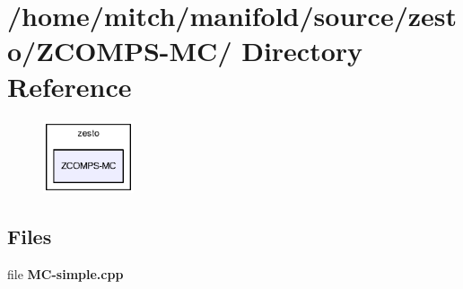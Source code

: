 \section{/home/mitch/manifold/source/zesto/ZCOMPS-MC/ Directory Reference}
\label{dir_beed766acd16aa68461aadbe21f00e75}


\nopagebreak
\begin{figure}[H]
\begin{center}
\leavevmode
\includegraphics[width=76pt]{dir_beed766acd16aa68461aadbe21f00e75_dep}
\end{center}
\end{figure}
\subsection*{Files}
\begin{CompactItemize}
\item 
file {\bf MC-simple.cpp}
\end{CompactItemize}
